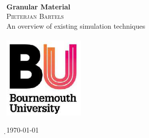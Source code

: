 \begin{titlepage}

\begin{center}

\textbf{}\\[1.0cm]

{ \huge \bfseries Granular Material}\\[1.5cm]



{\large
\textsc{Pieterjan Bartels}\\[5.0cm]

An overview of existing simulation techniques
\\[1.0cm]

\textbf{}\\[1.0cm]

\includegraphics[width=0.3\textwidth]{img/bu_logo}\\[1cm]

}

\vfill

{\large ̣\today}

\end{center}

\end{titlepage}

